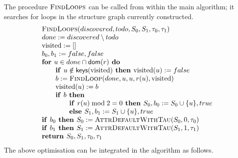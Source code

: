 \documentclass{article}
\newcommand{\If}{\text{\textbf{if }}}
\newcommand{\Do}{\text{\textbf{ do }}}
\newcommand{\Then}{\text{\textbf{ then }}}
\newcommand{\Return}{\text{\textbf{return }}}
\begin{document}
The procedure $\textsc{FindLoops}$ can be called from within the main algorithm; it searches for loops in the structure graph currently constructed.
\begin{equation*}
\begin{array}{l}
\text{\textsc{FindLoops}}(discovered, todo, S_0, S_1, \tau_0, \tau_1)\\  %
done := discovered \setminus todo \\
\text{visited} := [] \\
b_0,b_1 := false,false \\
\textbf{for } u \in done \cap \textsf{dom}(r) \Do \\
\qquad \If u \notin \textsf{keys}(\text{visited}) \Then \text{visited}(u) := false\\
\qquad b := \textsc{FindLoop}(done, u, u, r(u), \text{visited}) \\
\qquad \text{visited}(u) := b\\
\qquad \If b \Then \\
\qquad \qquad \If r(u) \bmod 2 = 0 \Then S_0,b_0 := S_0 \cup \{u\}, true\\
\qquad\qquad \textbf{else } S_1,b_1 := S_1 \cup \{u\}, true\\
\If b_0 \Then S_0 := \textsc{AttrDefaultWithTau}(S_0, 0, \tau_0)\\ 
\If b_1 \Then S_1 := \textsc{AttrDefaultWithTau}(S_1, 1, \tau_1)\\ 
\Return S_0, S_1, \tau_0, \tau_1
\end{array}
\end{equation*}
The above optimisation can be integrated in the algorithm as follows.
\end{document}
